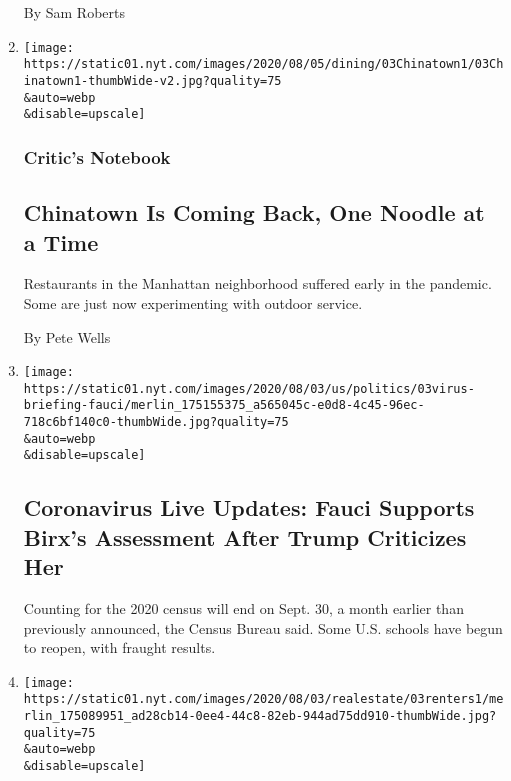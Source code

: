 \begin{enumerate}
  By Sam Roberts
\item
  \href{/2020/08/03/dining/chinatown-outdoor-dining-coronavirus.html}{}

  \texttt{[image: https://static01.nyt.com/images/2020/08/05/dining/03Chinatown1/03Chinatown1-thumbWide-v2.jpg?quality=75\\\&auto=webp\\\&disable=upscale]}

  \hypertarget{critics-notebook}{%
  \subsubsection{Critic's Notebook}\label{critics-notebook}}

  \hypertarget{chinatown-is-coming-back-one-noodle-at-a-time}{%
  \subsection{Chinatown Is Coming Back, One Noodle at a
  Time}\label{chinatown-is-coming-back-one-noodle-at-a-time}}

  Restaurants in the Manhattan neighborhood suffered early in the
  pandemic. Some are just now experimenting with outdoor service.

  By Pete Wells
\item
  \href{/2020/08/03/world/coronavirus-covid-19.html}{}

  \texttt{[image: https://static01.nyt.com/images/2020/08/03/us/politics/03virus-briefing-fauci/merlin\_175155375\_a565045c-e0d8-4c45-96ec-718c6bf140c0-thumbWide.jpg?quality=75\\\&auto=webp\\\&disable=upscale]}

  \hypertarget{coronavirus-live-updates-fauci-supports-birxs-assessment-after-trump-criticizes-her}{%
  \subsection{Coronavirus Live Updates: Fauci Supports Birx's Assessment
  After Trump Criticizes
  Her}\label{coronavirus-live-updates-fauci-supports-birxs-assessment-after-trump-criticizes-her}}

  Counting for the 2020 census will end on Sept. 30, a month earlier
  than previously announced, the Census Bureau said. Some U.S. schools
  have begun to reopen, with fraught results.
\item
  \href{/2020/08/03/realestate/coronavirus-roommate-renters.html}{}

  \texttt{[image: https://static01.nyt.com/images/2020/08/03/realestate/03renters1/merlin\_175089951\_ad28cb14-0ee4-44c8-82eb-944ad75dd910-thumbWide.jpg?quality=75\\\&auto=webp\\\&disable=upscale]}


\end{enumerate}
